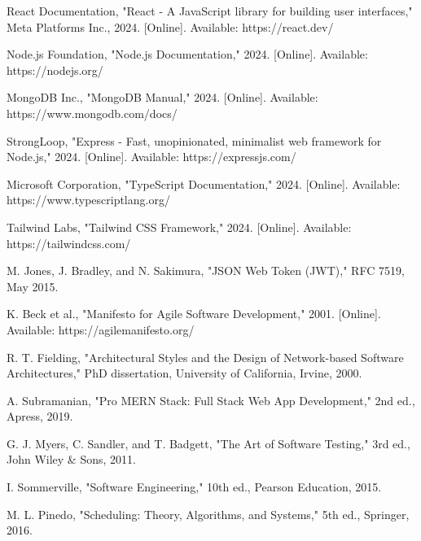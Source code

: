 \begin{thebibliography}{99}

React Documentation, "React - A JavaScript library for building user interfaces," Meta Platforms Inc., 2024. [Online]. Available: https://react.dev/

Node.js Foundation, "Node.js Documentation," 2024. [Online]. Available: https://nodejs.org/

MongoDB Inc., "MongoDB Manual," 2024. [Online]. Available: https://www.mongodb.com/docs/

StrongLoop, "Express - Fast, unopinionated, minimalist web framework for Node.js," 2024. [Online]. Available: https://expressjs.com/

Microsoft Corporation, "TypeScript Documentation," 2024. [Online]. Available: https://www.typescriptlang.org/

Tailwind Labs, "Tailwind CSS Framework," 2024. [Online]. Available: https://tailwindcss.com/

M. Jones, J. Bradley, and N. Sakimura, "JSON Web Token (JWT)," RFC 7519, May 2015.

K. Beck et al., "Manifesto for Agile Software Development," 2001. [Online]. Available: https://agilemanifesto.org/

R. T. Fielding, "Architectural Styles and the Design of Network-based Software Architectures," PhD dissertation, University of California, Irvine, 2000.

A. Subramanian, "Pro MERN Stack: Full Stack Web App Development," 2nd ed., Apress, 2019.

G. J. Myers, C. Sandler, and T. Badgett, "The Art of Software Testing," 3rd ed., John Wiley \& Sons, 2011.

I. Sommerville, "Software Engineering," 10th ed., Pearson Education, 2015.

M. L. Pinedo, "Scheduling: Theory, Algorithms, and Systems," 5th ed., Springer, 2016.

\end{thebibliography}
